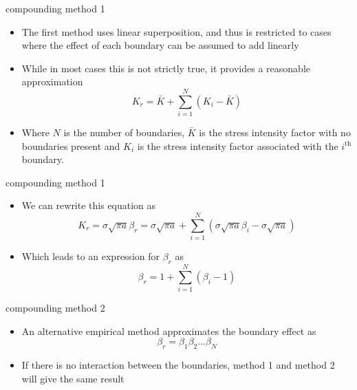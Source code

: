 \documentclass[10pt]{beamer}
\begin{document}
\begin{frame}{compounding method 1}
	\begin{itemize}
		\item The first method uses linear superposition, and thus is restricted to cases where the effect of each boundary can be assumed to add linearly
		\item While in most cases this is not strictly true, it provides a reasonable approximation
		\begin{equation}
		K_r = \bar{K} + \sum_{i=1}^{N}(K_i - \bar{K})
		\end{equation}
		\item Where $N$ is the number of boundaries, $\bar{K}$ is the stress intensity factor with no boundaries present and $K_i$ is the stress intensity factor associated with the $i^{\text{th}}$ boundary.
	\end{itemize}
\end{frame}

\begin{frame}{compounding method 1}
	\begin{itemize}
		\item We can rewrite this equation as
		\begin{equation}
		K_r = \sigma \sqrt{\pi a} \beta_r = \sigma \sqrt{\pi a} + \sum_{i=1}^{N}(\sigma \sqrt{\pi a}\beta_i - \sigma \sqrt{\pi a})
		\end{equation}
		\item Which leads to an expression for $\beta_r$ as
		\begin{equation}
		\beta_r = 1+\sum_{i=1}^{N} (\beta_i - 1)
		\end{equation}
	\end{itemize}
\end{frame}

\begin{frame}{compounding method 2}
	\begin{itemize}
		\item An alternative empirical method approximates the boundary effect as
		\begin{equation}
		\beta_r = \beta_1 \beta_2 ... \beta_N
		\end{equation}
		\item If there is no interaction between the boundaries, method 1 and method 2 will give the same result
	\end{itemize}
\end{frame}
\end{document}
